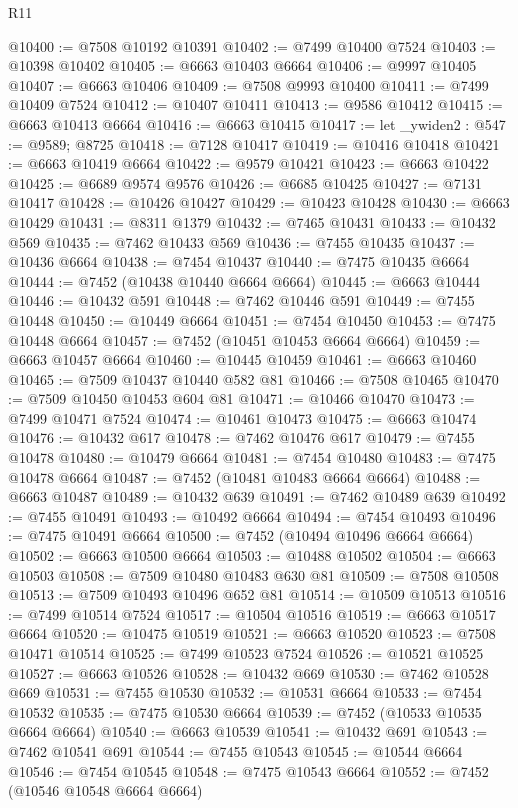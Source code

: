 \begin{lexlean}{R11}
\begin{coremodule}
@10400 := @7508 @10192 @10391
@10402 := @7499 @10400 @7524
@10403 := @10398 @10402
@10405 := @6663 @10403 @6664
@10406 := @9997 @10405
@10407 := @6663 @10406
@10409 := @7508 @9993 @10400
@10411 := @7499 @10409 @7524
@10412 := @10407 @10411
@10413 := @9586 @10412
@10415 := @6663 @10413 @6664
@10416 := @6663 @10415
@10417 := let _ywiden2 : @547 := @9589; @8725
@10418 := @7128 @10417
@10419 := @10416 @10418
@10421 := @6663 @10419 @6664
@10422 := @9579 @10421
@10423 := @6663 @10422
@10425 := @6689 @9574 @9576
@10426 := @6685 @10425
@10427 := @7131 @10417
@10428 := @10426 @10427
@10429 := @10423 @10428
@10430 := @6663 @10429
@10431 := @8311 @1379
@10432 := @7465 @10431
@10433 := @10432 @569
@10435 := @7462 @10433 @569
@10436 := @7455 @10435
@10437 := @10436 @6664
@10438 := @7454 @10437
@10440 := @7475 @10435 @6664
@10444 := @7452 (@10438 @10440 @6664 @6664)
@10445 := @6663 @10444
@10446 := @10432 @591
@10448 := @7462 @10446 @591
@10449 := @7455 @10448
@10450 := @10449 @6664
@10451 := @7454 @10450
@10453 := @7475 @10448 @6664
@10457 := @7452 (@10451 @10453 @6664 @6664)
@10459 := @6663 @10457 @6664
@10460 := @10445 @10459
@10461 := @6663 @10460
@10465 := @7509 @10437 @10440 @582 @81
@10466 := @7508 @10465
@10470 := @7509 @10450 @10453 @604 @81
@10471 := @10466 @10470
@10473 := @7499 @10471 @7524
@10474 := @10461 @10473
@10475 := @6663 @10474
@10476 := @10432 @617
@10478 := @7462 @10476 @617
@10479 := @7455 @10478
@10480 := @10479 @6664
@10481 := @7454 @10480
@10483 := @7475 @10478 @6664
@10487 := @7452 (@10481 @10483 @6664 @6664)
@10488 := @6663 @10487
@10489 := @10432 @639
@10491 := @7462 @10489 @639
@10492 := @7455 @10491
@10493 := @10492 @6664
@10494 := @7454 @10493
@10496 := @7475 @10491 @6664
@10500 := @7452 (@10494 @10496 @6664 @6664)
@10502 := @6663 @10500 @6664
@10503 := @10488 @10502
@10504 := @6663 @10503
@10508 := @7509 @10480 @10483 @630 @81
@10509 := @7508 @10508
@10513 := @7509 @10493 @10496 @652 @81
@10514 := @10509 @10513
@10516 := @7499 @10514 @7524
@10517 := @10504 @10516
@10519 := @6663 @10517 @6664
@10520 := @10475 @10519
@10521 := @6663 @10520
@10523 := @7508 @10471 @10514
@10525 := @7499 @10523 @7524
@10526 := @10521 @10525
@10527 := @6663 @10526
@10528 := @10432 @669
@10530 := @7462 @10528 @669
@10531 := @7455 @10530
@10532 := @10531 @6664
@10533 := @7454 @10532
@10535 := @7475 @10530 @6664
@10539 := @7452 (@10533 @10535 @6664 @6664)
@10540 := @6663 @10539
@10541 := @10432 @691
@10543 := @7462 @10541 @691
@10544 := @7455 @10543
@10545 := @10544 @6664
@10546 := @7454 @10545
@10548 := @7475 @10543 @6664
@10552 := @7452 (@10546 @10548 @6664 @6664)

\end{coremodule}
\end{lexlean}
